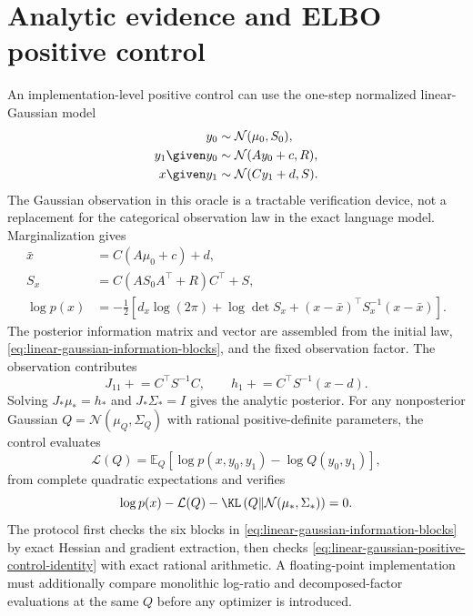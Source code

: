 \section{Analytic evidence and ELBO positive control}

An implementation-level positive control can use the one-step normalized linear-Gaussian model
\begin{equation}
\begin{aligned}
y_0&\sim\mathcal N(\mu_0,S_0),\\
y_1\given y_0&\sim\mathcal N(Ay_0+c,R),\\
x\given y_1&\sim\mathcal N(Cy_1+d,S).
\end{aligned}
\label{eq:linear-gaussian-positive-control-model}
\end{equation}
The Gaussian observation in this oracle is a tractable verification device, not a replacement for the categorical observation law in the exact language model. Marginalization gives
\begin{equation}
\begin{aligned}
\bar x
&=C(A\mu_0+c)+d,\\
S_x
&=C(AS_0A^\top+R)C^\top+S,\\
\log p(x)
&=-\frac12\left[
d_x\log(2\pi)+\log\det S_x
+(x-\bar x)^\top S_x^{-1}(x-\bar x)
\right].
\end{aligned}
\label{eq:linear-gaussian-positive-control-evidence}
\end{equation}
The posterior information matrix and vector are assembled from the initial law, \cref{eq:linear-gaussian-information-blocks}, and the fixed observation factor. The observation contributes
\begin{equation}
J_{11}\mathrel{+}=C^\top S^{-1}C,
\qquad
h_1\mathrel{+}=C^\top S^{-1}(x-d).
\label{eq:gaussian-observation-information-contribution}
\end{equation}
Solving $J_*\mu_*=h_*$ and $J_*\Sigma_*=I$ gives the analytic posterior. For any nonposterior Gaussian $Q=\mathcal N(\mu_Q,\Sigma_Q)$ with rational positive-definite parameters, the control evaluates
\begin{equation}
\mathcal L(Q)
=\mathbb E_Q[\log p(x,y_0,y_1)-\log Q(y_0,y_1)],
\label{eq:linear-gaussian-positive-control-elbo}
\end{equation}
from complete quadratic expectations and verifies
\begin{equation}
\log p(x)-\mathcal L(Q)
-\KL\left(Q\middle\Vert
\mathcal N(\mu_*,\Sigma_*)\right)=0.
\label{eq:linear-gaussian-positive-control-identity}
\end{equation}
The protocol first checks the six blocks in \cref{eq:linear-gaussian-information-blocks} by exact Hessian and gradient extraction, then checks \cref{eq:linear-gaussian-positive-control-identity} with exact rational arithmetic. A floating-point implementation must additionally compare monolithic log-ratio and decomposed-factor evaluations at the same $Q$ before any optimizer is introduced.

